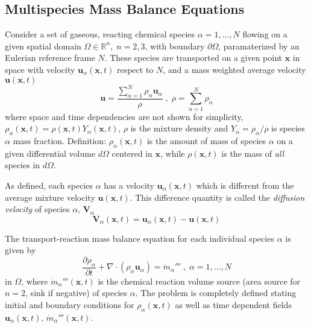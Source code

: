 \subsection{Multispecies Mass Balance Equations}

Consider a set of gaseous, reacting  chemical species $\alpha=1,\dots,N$ flowing on a given spatial domain $\Omega \in \mathbb{R}^n, \; n=2,3$, with boundary $\partial \Omega$, paramaterized by an Eulerian reference frame $N$. These species are transported on a given point $\mathbf{x}$ in space with velocity $\mathbf{u}_\alpha(\mathbf{x},t)$ respect to $N$, and a mass weighted average velocity $\mathbf{u}(\mathbf{x},t)$
%
\begin{equation}
  \mathbf{u} = \frac{ \sum\limits_{\alpha=1}^{N} {\rho_\alpha \mathbf{u}_\alpha}}{\rho} \; , \; \rho =  \sum\limits_{\alpha=1}^{N} {\rho_\alpha} \label{eq:veldens}
\end{equation}
%
where space and time dependencies are not shown for simplicity, $\rho_\alpha(\mathbf{x},t) = \rho(\mathbf{x},t) Y_\alpha (\mathbf{x},t)$, $\rho$ is the mixture density and $Y_\alpha = \rho_\alpha / \rho$ is species $\alpha$ mass fraction. Definition: $\rho_\alpha(\mathbf{x},t)$ is the amount of mass of species $\alpha$ on a given differential volume $d\Omega$ centered in $\mathbf{x}$, while  $\rho(\mathbf{x},t)$ is the mass of \textit{all} species in $d\Omega$.

As defined, each species $\alpha$ has a velocity $\mathbf{u}_\alpha(\mathbf{x},t)$ which is different from the average mixture velocity $\mathbf{u}(\mathbf{x},t)$. This difference quantity is called the \textit{diffusion velocity} of species $\alpha$, $\mathbf{V}_\alpha$
%
\begin{equation}
   \mathbf{V}_\alpha(\mathbf{x},t) = \mathbf{u}_\alpha(\mathbf{x},t) - \mathbf{u}(\mathbf{x},t) \label{eq:vdiff}
\end{equation}
%

The transport-reaction mass balance equation for each individual species $\alpha$ is given by
%
\begin{equation}
   \frac{\partial \rho_\alpha}{ \partial t} + \nabla \cdot (\rho_\alpha  \mathbf{u}_\alpha) = \dot{m}_\alpha''' \; , \; \alpha=1,\dots,N \label{eq:bal}
\end{equation}
%
in $\Omega$, where $\dot{m}_\alpha'''(\mathbf{x},t)$ is the chemical reaction volume source (area source for $n=2$, sink if negative) of species $\alpha$. The problem is completely defined stating initial and boundary conditions for $\rho_\alpha(\mathbf{x},t)$ as well as time dependent fields $\mathbf{u}_\alpha(\mathbf{x},t)$, $\dot{m}_\alpha'''(\mathbf{x},t)$.


